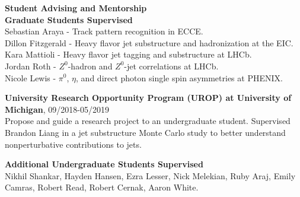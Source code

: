\documentclass[11pt]{article}
\begin{document}




\begin{flushleft}
\LARGE \textbf{Student Advising and Mentorship}\\
\normalsize
\vspace{0.3cm}
\textbf{Graduate Students Supervised}\\
Sebastian Araya - Track pattern recognition in ECCE. \\
Dillon Fitzgerald - Heavy flavor jet substructure and hadronization at the EIC. \\
Kara Mattioli - Heavy flavor jet tagging and substructure at LHCb. \\
Jordan Roth - $Z^0$-hadron and $Z^0$-jet correlations at LHCb. \\
Nicole Lewis - $\pi^0$, $\eta$, and direct photon single spin asymmetries at PHENIX. \\

\vspace{0.5cm}

\textbf{University Research Opportunity Program (UROP) at University of Michigan}, 09/2018-05/2019\\
Propose and guide a research project to an undergraduate student. Supervised Brandon Liang in a jet substructure Monte Carlo study to better understand nonperturbative contributions to jets.\\
\vspace*{0.3cm}

\textbf{Additional Undergraduate Students Supervised}\\
Nikhil Shankar, Hayden Hansen, Ezra Lesser, Nick Melekian, Ruby Araj, Emily Camras, Robert Read, Robert Cernak, Aaron White.
\end{flushleft}
\end{document}
